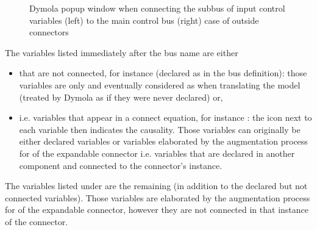\documentclass[letterpaper,10pt, openany,english]{sphinxmanual}
\begin{document}
\begin{figure}[htbp]
\centering
\capstart

\noindent{}
\caption{Dymola pop\sphinxhyphen{}up window when connecting the sub\sphinxhyphen{}bus of input control variables (left) to the main control bus (right) \textendash{} case of outside connectors}\label{\detokenize{requirements:dymola-bus}}\end{figure}

The variables listed immediately after the bus name are either
\begin{itemize}
\item {} 
 that are not connected, for instance  (declared as  in the bus definition): those variables are only  and eventually considered as  when translating the model (treated by Dymola as if they were never declared) or,

\item {} 
 i.e. variables that appear in a connect equation, for instance : the icon next to each variable then indicates the causality. Those variables can originally be either declared variables or variables elaborated by the augmentation process for  of the expandable connector i.e. variables that are declared in another component and connected to the connector’s instance.

\end{itemize}

The variables listed under  are the remaining  (in addition to the declared but not connected variables). Those variables are elaborated by the augmentation process for  of the expandable connector, however they are not connected in that instance of the connector.
\end{document}
